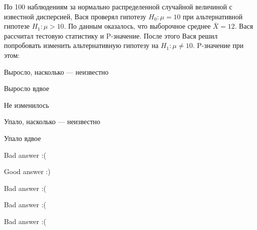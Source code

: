 
\begin{question}
По 100 наблюдениям за нормально распределенной случайной величиной с
известной дисперсией, Вася проверял гипотезу \(H_0: \mu = 10\) при
альтернативной гипотезе \(H_1: \mu > 10\). По данным оказалось, что
выборочное среднее \(\bar{X} = 12\). Вася рассчитал тестовую статистику
и P-значение. После этого Вася решил попробовать изменить альтернативную
гипотезу на \(H_1: \mu \neq 10\). P-значение при этом:
\begin{answerlist}
  \item Выросло, насколько --- неизвестно
  \item Выросло вдвое
  \item Не изменилось
  \item Упало, насколько --- неизвестно
  \item Упало вдвое
\end{answerlist}
\end{question}

\begin{solution}
\begin{answerlist}
  \item Bad answer :(
  \item Good answer :)
  \item Bad answer :(
  \item Bad answer :(
  \item Bad answer :(
\end{answerlist}
\end{solution}

